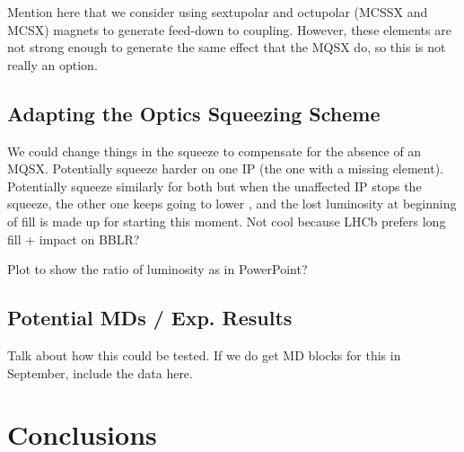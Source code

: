 Mention here that we consider using sextupolar and octupolar (MCSSX and MCSX) magnets to generate feed-down to coupling.
However, these elements are not strong enough to generate the same effect that the MQSX do, so this is not really an option.

\subsection{Adapting the Optics Squeezing Scheme}

We could change things in the squeeze to compensate for the absence of an MQSX.
Potentially squeeze harder on one IP (the one with a missing element).
Potentially squeeze similarly for both but when the unaffected IP stops the squeeze, the other one keeps going to lower \betastar, and the lost luminosity at beginning of fill is made up for starting this moment.
Not cool because LHCb prefers long fill + impact on BBLR?

Plot to show the ratio of luminosity as in PowerPoint?

\subsection{Potential MDs / Exp. Results}

Talk about how this could be tested.
If we do get MD blocks for this in September, include the data here.


\section{Conclusions}

